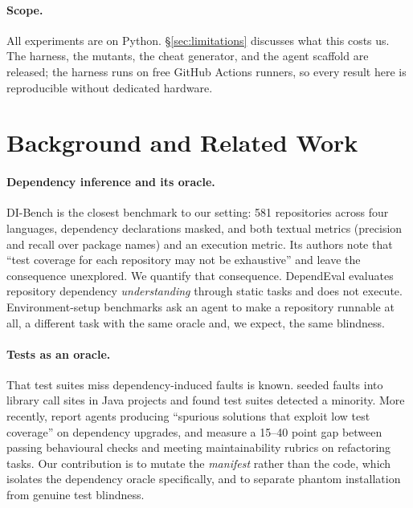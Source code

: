 \documentclass[11pt]{article}
\newcommand{\dibench}{DI-Bench}
\begin{document}
\paragraph{Scope.}
All experiments are on Python.
\S\ref{sec:limitations} discusses what this costs us.
The harness, the mutants, the cheat generator, and the agent scaffold are released; the harness runs on free GitHub Actions runners, so every result here is reproducible without dedicated hardware.

\section{Background and Related Work}
\label{sec:related}

\paragraph{Dependency inference and its oracle.}
\dibench{} \citep{dibench2025} is the closest benchmark to our setting: 581 repositories across four languages, dependency declarations masked, and both textual metrics (precision and recall over package names) and an execution metric.
Its authors note that ``test coverage for each repository may not be exhaustive'' and leave the consequence unexplored.
We quantify that consequence.
DependEval \citep{dependeval2025} evaluates repository dependency \emph{understanding} through static tasks and does not execute.
Environment-setup benchmarks \citep{envbench2025,repo2run2025} ask an agent to make a repository runnable at all, a different task with the same oracle and, we expect, the same blindness.

\paragraph{Tests as an oracle.}
That test suites miss dependency-induced faults is known.
\citet{hejderup2022trust} seeded faults into library call sites in Java projects and found test suites detected a minority.
More recently, \citet{timemachine2026} report agents producing ``spurious solutions that exploit low test coverage'' on dependency upgrades, and \citet{sweatlas2026} measure a 15--40 point gap between passing behavioural checks and meeting maintainability rubrics on refactoring tasks.
Our contribution is to mutate the \emph{manifest} rather than the code, which isolates the dependency oracle specifically, and to separate phantom installation from genuine test blindness.
\end{document}
